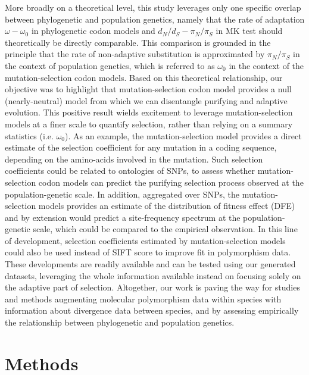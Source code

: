 \documentclass{article}
\newcommand{\dn}{d_N}
\newcommand{\ds}{d_S}
\newcommand{\dnds}{\dn / \ds}
\newcommand{\pn}{\pi_N}
\newcommand{\ps}{\pi_S}
\newcommand{\pnps}{\pn / \ps}
\begin{document}
More broadly on a theoretical level, this study leverages only one specific overlap between phylogenetic and population genetics, namely that the rate of adaptation $\omega - \omega_{0}$ in phylogenetic codon models and $\dnds - \pnps$ in MK test should theoretically be directly comparable.
This comparison is grounded in the principle that the rate of non-adaptive substitution is approximated by $\pnps$ in the context of population genetics, which is referred to as $\omega_{0}$ in the context of the mutation-selection codon models.
Based on this theoretical relationship, our objective was to highlight that mutation-selection codon model provides a null (nearly-neutral) model from which we can disentangle purifying and adaptive evolution.
This positive result wields excitement to leverage mutation-selection models at a finer scale to quantify selection, rather than relying on a summary statistics (i.e. $\omega_{0}$).
As an example, the mutation-selection model provides a direct estimate of the selection coefficient for any mutation in a coding sequence, depending on the amino-acids involved in the mutation.
Such selection coefficients could be related to ontologies of SNPs, to assess whether mutation-selection codon models can predict the purifying selection process observed at the population-genetic scale.
In addition, aggregated over SNPs, the mutation-selection models provides an estimate of the distribution of fitness effect (DFE) and by extension would predict a site-frequency spectrum at the population-genetic scale, which could be compared to the empirical observation.
In this line of development, selection coefficients estimated by mutation-selection models could also be used instead of SIFT score to improve fit in polymorphism data\cite{chen_hunting_2021}.
These developments are readily available and can be tested using our generated datasets, leveraging the whole information available instead on focusing solely on the adaptive part of selection.
Altogether, our work is paving the way for studies and methods augmenting molecular polymorphism data within species with information about divergence data between species, and by assessing empirically the relationship between phylogenetic and population genetics\cite{thorne_codon_2012}.

\section*{Methods}\label{sec:methods}
\end{document}
